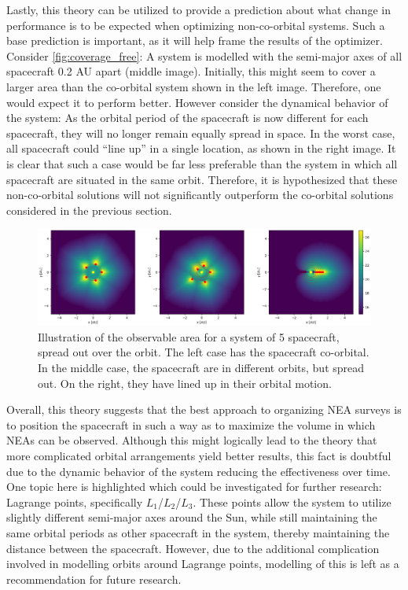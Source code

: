 Lastly, this theory can be utilized to provide a prediction about what change in performance is to be expected when optimizing non-co-orbital systems. Such a base prediction is important, as it will help frame the results of the optimizer.  Consider \autoref{fig:coverage_free}: A system is modelled with the semi-major axes of all spacecraft 0.2 AU apart (middle image). Initially, this might seem to cover a larger area than the co-orbital system shown in the left image. Therefore, one would expect it to perform better. However consider the dynamical behavior of the system: As the orbital period of the spacecraft is now different for each spacecraft, they will no longer remain equally spread in space. In the worst case, all spacecraft could ``line up'' in a single location, as shown in the right image. It is clear that such a case would be far less preferable than the system in which all spacecraft are situated in the same orbit. Therefore, it is hypothesized that these non-co-orbital solutions will not significantly outperform the co-orbital solutions considered in the previous section.\\

\begin{figure}[htbp]
 \centering
 \includegraphics[width=1.0\textwidth]{img/coverage_free.png}
 \caption{Illustration of the observable area for a system of 5 spacecraft, spread out over the orbit. The left case has the spacecraft co-orbital. In the middle case, the spacecraft are in different orbits, but spread out. On the right, they have lined up in their orbital motion.}
 \label{fig:coverage_free}
\end{figure}

Overall, this theory suggests that the best approach to organizing NEA surveys is to position the spacecraft in such a way as to maximize the volume in which NEAs can be observed. Although this might logically lead to the theory that more complicated orbital arrangements yield better results, this fact is doubtful due to the dynamic behavior of the system reducing the effectiveness over time. One topic here is highlighted which could be investigated for further research: Lagrange points, specifically $L_1$/$L_2$/$L_3$. These points allow the system to utilize slightly different semi-major axes around the Sun, while still maintaining the same orbital periods as other spacecraft in the system, thereby maintaining the distance between the spacecraft. However, due to the additional complication involved in modelling orbits around Lagrange points, modelling of this is left as a recommendation for future research.

